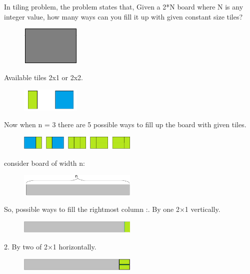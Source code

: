 \documentclass[12pt]{article}
\begin{document}
{In tiling problem, the problem states that,\newline
Given a 2*N board where  N is any integer value, how many ways can you fill it up with given constant size tiles? 
\begin{figure}[H]
\centering
\includegraphics[width=0.25\textwidth]{tile_2xn.png}
\end{figure}
Available tiles 2x1 or 2x2.
\begin{figure}[H]
\centering
\includegraphics[width=0.25\textwidth]{2x1_2x2.png}
\end{figure}
Now when n = 3 there are 5 possible ways to fill up the board with given tiles. 
\begin{figure}[H]
\centering
\includegraphics[width=0.5\textwidth]{n3_5.png}
\end{figure}
consider board of width n:
\begin{figure}[H]
\centering
\includegraphics[width=0.5\textwidth]{fn.png}
\end{figure}
So, possible ways to fill the rightmost column :. By one 2×1 vertically.
\begin{figure}[H]
\centering
\includegraphics[width=0.5\textwidth]{f1_2x1.png}
\end{figure}
2. By two of 2×1 horizontally.
\begin{figure}[H]
\centering
\includegraphics[width=0.5\textwidth]{f2_2x1.png}
\end{figure}
}
\end{document}
